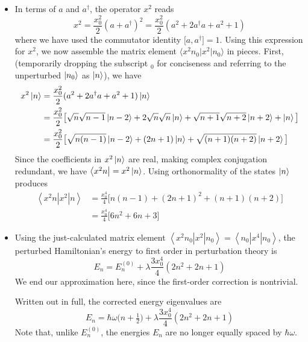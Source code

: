 \documentclass[11pt, a4paper]{article}
\newcommand{\Ham}{Hamiltonian\xspace}
\newcommand{\bmel}[3]{\big \langle {#1} \big | {#2} \big | {#3} \big \rangle}  %
\newcommand{\threebraket}[3]{\left \langle {#1} \left | {#2} \right | {#3} \right \rangle}  %
\begin{document}
\begin{itemize}
	\item In terms of $ a $ and $ a^{\dagger} $, the operator $ x^{2} $ reads
	\begin{equation*}
		x^{2} = \frac{x_{0}^{2}}{2}(a+a^{\dagger})^{2} = \frac{x_{0}^{2}}{2}(a^{2} + 2a^{\dagger}a + a^{2} + 1)
	\end{equation*}
	where we have used the commutator identity $ \big[a, a^{\dagger}\big] = 1 $. Using this expression for $ x^{2} $, we now assemble the matrix element $ \bmel{x^{2}n_{0}}{x^{2}}{n_{0}} $ in pieces. First, (temporarily dropping the subscript $ _{0} $ for conciseness and referring to the unperturbed $ \ket{n_{0}} $ as $ \ket{n} $), we have
	\begin{align*}
		 x^{2} \ket{n} &= \frac{x_{0}^{2}}{2}(a^{2} + 2a^{\dagger}a + a^{2} + 1)\ket{n} \\
		&= \frac{x_{0}^{2}}{2}\big[\sqrt{n}\sqrt{n-1}\ket{n-2} + 2\sqrt{n}\sqrt{n}\ket{n} + \sqrt{n+1}\sqrt{n+2}\ket{n+2} + \ket{n}\big]\\
		& = \frac{x_{0}^{2}}{2}\big[\sqrt{n(n-1)}\ket{n-2}+(2n+1)\ket{n}+\sqrt{(n+1)(n+2)}\ket{n+2}\big]
	\end{align*}
	Since the coefficients in $ x^{2} \ket{n} $ are real, making complex conjugation redundant, we have $ \bra{x^{2}n} = x^{2} \ket{n} $. Using orthonormality of the states $ \ket{n} $ produces
	\begin{align*}
		\threebraket{x^{2}n}{x^{2}}{n} &= \frac{x_{0}^{4}}{4}\big[n(n-1) + (2n+1)^{2} + (n+1)(n+2)\big]\\
		&= \frac{x_{0}^{4}}{4}\big[6n^{2} + 6n + 3\big]
	\end{align*}
	
	\item Using the just-calculated matrix element $ \threebraket{x^{2}n_{0}}{x^{2}}{n_{0}} = \threebraket{n_{0}}{x^{4}}{n_{0}} $, the perturbed \Ham's energy to first order in perturbation theory is
	\begin{equation*}
		E_{n} = E^{(0)}_{n} + \lambda \frac{3x_{0}^{4}}{4}(2n^{2} + 2n + 1)
	\end{equation*}
	We end our approximation here, since the first-order correction is nontrivial.
	
	Written out in full, the corrected energy eigenvalues are
	\begin{equation*}
		E_{n} = \hbar \omega\big(n + \tfrac{1}{2}\big) + \lambda \frac{3x_{0}^{4}}{4}(2n^{2} + 2n + 1)
	\end{equation*}
	Note that, unlike $ E^{(0)}_{n} $, the energies $ E_{n} $ are no longer equally spaced by $ \hbar \omega $.
\end{itemize}
\end{document}
